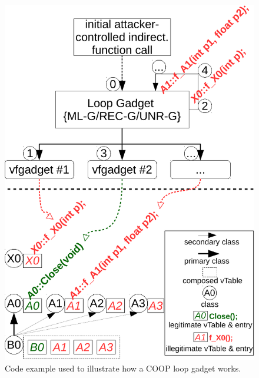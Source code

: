 \hspace{2.0cm}
\begin{figure}
 \begin{minipage}{.45\linewidth}
\usebox{\firstlisting}
\end{minipage}%
\hfill
%
\hspace{1.1cm}
\begin{minipage}{.5\linewidth}
    \includegraphics[width=1.2\textwidth]{figures/loop.pdf}
\end{minipage}
\caption{Code example used to illustrate how a COOP loop gadget works.}
\label{Code example used to illustrate how a COOP loop gadget works}
\end{figure}

